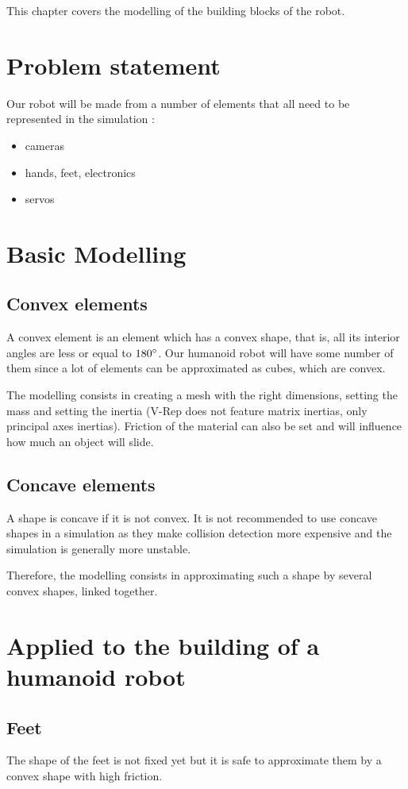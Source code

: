This chapter covers the modelling of the building blocks of the robot.

\section{Problem statement}
Our robot will be made from a number of elements that all need to be represented in the simulation :\begin{itemize}
\item cameras
\item hands, feet, electronics
\item servos
\end{itemize}

\section{Basic Modelling}
\subsection{Convex elements}
A convex element is an element which has a convex shape, that is, all its interior angles are less or equal to $180\degree$. Our humanoid robot will have some number of them since a lot of elements can be approximated as cubes, which are convex.

The modelling consists in creating a mesh with the right dimensions, setting the mass and setting the inertia (V-Rep does not feature matrix inertias, only principal axes inertias). Friction of the material can also be set and will influence how much an object will slide.

\subsection{Concave elements}
A shape is concave if it is not convex. It is not recommended to use concave shapes in a simulation as they make collision detection more expensive and the simulation is generally more unstable. 

Therefore, the modelling consists in approximating such a shape by several convex shapes, linked together.

\section{Applied to the building of a humanoid robot}
\subsection{Feet}
The shape of the feet is not fixed yet but it is safe to approximate them by a convex shape with high friction. 

